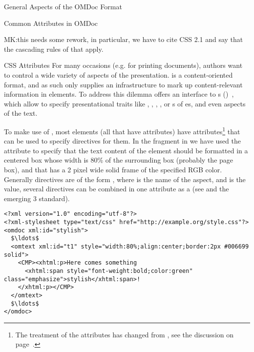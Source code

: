 \begin{tchapter}[id=spec-intro]{General Aspects of the OMDoc Format}
\begin{tsection}[id=common-attribs]{Common Attributes in OMDoc}
\begin{oldpart}{MK:this needs some rework, in particular, we have to cite CSS 2.1 and say
    that the cascading rules of that apply.}
\begin{tsubsection}[id=css-attribs]{CSS Attributes}
  For many occasions (e.g. for printing {\omdoc} documents), authors want to control a
  wide variety of aspects of the presentation. {\omdoc} is a content-oriented format, and
  as such only supplies an infrastructure to mark up content-relevant information in
  {\omdoc} elements. To address this dilemma {\xml} offers an interface to 
  {s} ({\css})~\cite{BosHak:css98}, which allow to specify
  presentational traits like {}, {},
  {}, {}, or {s} of
  {es}, and even {} aspects of the text.
  
  To make use of {\css}, most {\omdoc} elements (all that have
  {} attributes) have {}
  attributes\footnote{The treatment of the {\css} attributes has changed from
    {}, see the discussion on
    page~\pageref{style/class-comment}.} that can be used to specify
  {\css} directives for them. In the {\omdoc} fragment in
  {} we have used the {} attribute to specify
  that the text content of the {} element should be formatted in a
  centered box whose width is 80\% of the surrounding box (probably the page box), and
  that has a 2 pixel wide solid frame of the specified RGB color. Generally {\css}
  directives are of the form {}, where {} is the name of the
  aspect, and {} is the value, several {\css} directives
  can be combined in one {} attribute as a
  {} (see {\cite{BosHak:css98} and the emerging {\css}
    3} standard).

\begin{lstlisting}[label=lst:css-basic,mathescape,
   caption={Basic {\css} Directives in a {\attributeshort{style}} Attribute},
   index={style,class}]
<?xml version="1.0" encoding="utf-8"?>
<?xml-stylesheet type="text/css" href="http://example.org/style.css"?>
<omdoc xml:id="stylish">
  $\ldots$
  <omtext xml:id="t1" style="width:80%;align:center;border:2px #006699 solid">
    <CMP><xhtml:p>Here comes something 
      <xhtml:span style="font-weight:bold;color:green" class="emphasize">stylish</xhtml:span>!
    </xhtml:p></CMP>
  </omtext>
  $\ldots$
</omdoc>
\end{lstlisting}


\end{tsubsection}
\end{oldpart}
\end{tsection}
\end{tchapter}
